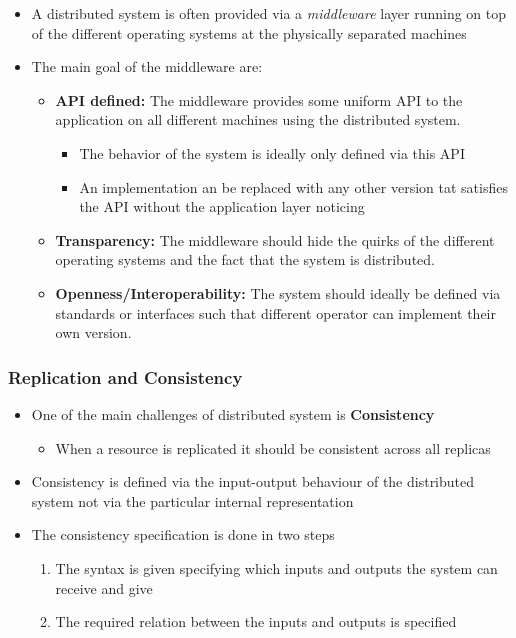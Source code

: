 \documentclass[11pt]{article}
\begin{document}
\begin{itemize}
\item A distributed system is often provided via a \emph{middleware} layer running on top of the different operating systems at the physically separated machines
\item The main goal of the middleware are:
\begin{itemize}
\item \textbf{API defined:} The middleware provides some uniform API to the application on all different machines using the distributed system.
\begin{itemize}
\item The behavior of the system is ideally only defined via this API
\item An implementation an be replaced with any other version tat satisfies the API without the application layer noticing
\end{itemize}
\item \textbf{Transparency:} The middleware should hide the quirks of the different operating systems and the fact that the system is distributed.
\item \textbf{Openness/Interoperability:} The system should ideally be defined via standards or interfaces such that different operator can implement their own version.
\end{itemize}
\end{itemize}

\subsubsection{Replication and Consistency}
\label{sec:orgb4a8919}
\begin{itemize}
\item One of the main challenges of distributed system is \textbf{Consistency} 
\begin{itemize}
\item When a resource is replicated it should be consistent across all replicas
\end{itemize}

\item Consistency is defined via the input-output behaviour of the distributed system not via the particular internal representation
\item The consistency specification is done in two steps
\begin{enumerate}
\item The syntax is given specifying which inputs and outputs the system can receive and give
\item The required relation between the inputs and outputs is specified
\end{enumerate}
\end{itemize}
\end{document}
